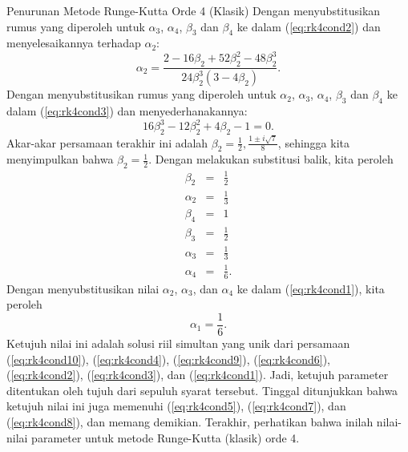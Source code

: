 \begin{digression}{Penurunan Metode Runge-Kutta Orde 4 (Klasik)}
\noindent Dengan menyubstitusikan rumus yang diperoleh untuk $\alpha_{3}$,
$\alpha_{4}$, $\beta_{3}$ dan $\beta_{4}$ ke dalam (\ref{eq:rk4cond2})
dan menyelesaikannya terhadap $\alpha_{2}$:
\[
\alpha_{2}=\frac{2-16\beta_{2}+52\beta_{2}^{2}-48\beta_{2}^{3}}{24\beta_{2}^{3}\left(3-4\beta_{2}\right)}.
\]
Dengan menyubstitusikan rumus yang diperoleh untuk $\alpha_{2}$,
$\alpha_{3}$, $\alpha_{4}$, $\beta_{3}$ dan $\beta_{4}$ ke dalam
(\ref{eq:rk4cond3}) dan menyederhanakannya:
\[
16\beta_{2}^{3}-12\beta_{2}^{2}+4\beta_{2}-1=0.
\]
Akar-akar persamaan terakhir ini adalah $\beta_{2}=\frac{1}{2},\frac{1\pm i\sqrt{7}}{8}$,
sehingga kita menyimpulkan bahwa $\beta_{2}=\frac{1}{2}$. Dengan
melakukan substitusi balik, kita peroleh
\begin{eqnarray*}
\beta_{2} & = & \frac{1}{2}\\
\alpha_{2} & = & \frac{1}{3}\\
\beta_{4} & = & 1\\
\beta_{3} & = & \frac{1}{2}\\
\alpha_{3} & = & \frac{1}{3}\\
\alpha_{4} & = & \frac{1}{6}.
\end{eqnarray*}
Dengan menyubstitusikan nilai $\alpha_{2}$, $\alpha_{3}$, dan $\alpha_{4}$
ke dalam (\ref{eq:rk4cond1}), kita peroleh
\[
\alpha_{1}=\frac{1}{6}.
\]
Ketujuh nilai ini adalah solusi riil simultan yang unik dari persamaan
(\ref{eq:rk4cond10}), (\ref{eq:rk4cond4}), (\ref{eq:rk4cond9}),
(\ref{eq:rk4cond6}), (\ref{eq:rk4cond2}), (\ref{eq:rk4cond3}),
dan (\ref{eq:rk4cond1}). Jadi, ketujuh parameter ditentukan oleh
tujuh dari sepuluh syarat tersebut. Tinggal ditunjukkan bahwa ketujuh
nilai ini juga memenuhi (\ref{eq:rk4cond5}), (\ref{eq:rk4cond7}),
dan (\ref{eq:rk4cond8}), dan memang demikian. Terakhir, perhatikan
bahwa inilah nilai-nilai parameter untuk metode Runge-Kutta (klasik)
orde 4.

\noindent\end{digression}

